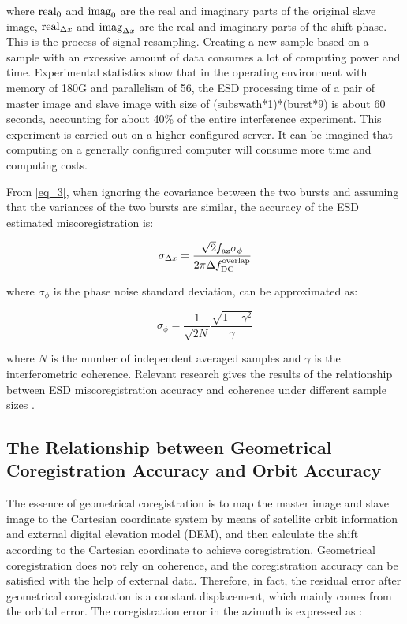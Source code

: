 \documentclass[a4paper,fleqn]{cas-sc}
\begin{document}
\noindent where ${\rm real}_0$ and ${\rm imag}_0$ are the real and imaginary parts of the original slave image, ${\rm real}_{\Delta x}$ and ${\rm imag}_{\Delta x}$ are the real and imaginary parts of the shift phase. This is the process of signal resampling. Creating a new sample based on a sample with an excessive amount of data consumes a lot of computing power and time. Experimental statistics show that in the operating environment with memory of 180G and parallelism of 56, the ESD processing time of a pair of master image and slave image with size of (subswath*1)*(burst*9) is about 60 seconds, accounting for about 40\% of the entire interference experiment. This experiment is carried out on a higher-configured server. It can be imagined that computing on a generally configured computer will consume more time and computing costs. \par

From \ref{eq_3}, when ignoring the covariance between the two bursts and assuming that the variances of the two bursts are similar, the accuracy of the ESD estimated miscoregistration is: \par

\begin{equation}
    \sigma_{\Delta x} = \frac{\sqrt{2} f_{\rm az} \sigma_\phi}{2 \pi \Delta f_{\rm DC}^{\rm overlap}}
    \label{eq_6}
\end{equation}

\noindent where $\sigma_\phi$ is the phase noise standard deviation, can be approximated as: \par

\begin{equation}
    \sigma_{\phi} = \frac{1}{\sqrt{2N}} \frac{\sqrt{1 - \gamma^2}}{\gamma}
    \label{eq_7}
\end{equation}

\noindent where $N$ is the number of independent averaged samples and $\gamma$ is the interferometric coherence. Relevant research gives the results of the relationship between ESD miscoregistration accuracy and coherence under different sample sizes \cite{A_Network-Based_Enhanced_Spectral_Diversity_Approach_for_TOPS_Time-Series_Analysis}.

\subsection{The Relationship between Geometrical Coregistration Accuracy and Orbit Accuracy}
The essence of geometrical coregistration is to map the master image and slave image to the Cartesian coordinate system by means of satellite orbit information and external digital elevation model (DEM), and then calculate the shift according to the Cartesian coordinate to achieve coregistration. Geometrical coregistration does not rely on coherence, and the coregistration accuracy can be satisfied with the help of external data. Therefore, in fact, the residual error after geometrical coregistration is a constant displacement, which mainly comes from the orbital error. The coregistration error in the azimuth is expressed as \cite{Geometrical_SAR_image_registration}: \par
\end{document}
